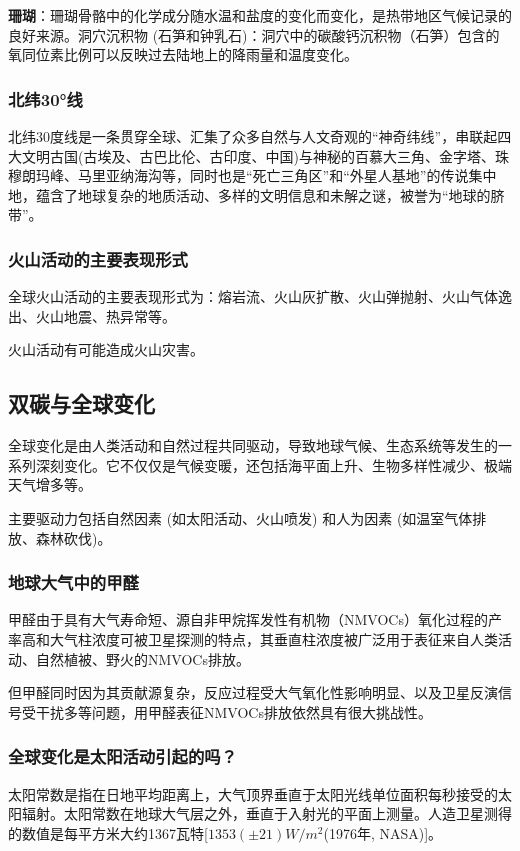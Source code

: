 \documentclass[12pt,a4paper]{article}
\begin{document}
	\textbf{珊瑚}：珊瑚骨骼中的化学成分随水温和盐度的变化而变化，是热带地区气候记录的良好来源。洞穴沉积物 (石笋和钟乳石)：洞穴中的碳酸钙沉积物（石笋）包含的氧同位素比例可以反映过去陆地上的降雨量和温度变化。
	
	\subsubsection{北纬30°线}
	北纬30度线是一条贯穿全球、汇集了众多自然与人文奇观的“神奇纬线”，串联起四大文明古国(古埃及、古巴比伦、古印度、中国)与神秘的百慕大三角、金字塔、珠穆朗玛峰、马里亚纳海沟等，同时也是“死亡三角区”和“外星人基地”的传说集中地，蕴含了地球复杂的地质活动、多样的文明信息和未解之谜，被誉为“地球的脐带”。
	\subsubsection{火山活动的主要表现形式}
	全球火山活动的主要表现形式为：熔岩流、火山灰扩散、火山弹抛射、火山气体逸出、火山地震、热异常等。
	
	火山活动有可能造成火山灾害。
	
	\subsection{双碳与全球变化}
	全球变化是由人类活动和自然过程共同驱动，导致地球气候、生态系统等发生的一系列深刻变化。它不仅仅是气候变暖，还包括海平面上升、生物多样性减少、极端天气增多等。
	
	主要驱动力包括自然因素 (如太阳活动、火山喷发) 和人为因素 (如温室气体排放、森林砍伐)。
	
	\subsubsection{地球大气中的甲醛}
	甲醛由于具有大气寿命短、源自非甲烷挥发性有机物（NMVOCs）氧化过程的产率高和大气柱浓度可被卫星探测的特点，其垂直柱浓度被广泛用于表征来自人类活动、自然植被、野火的NMVOCs排放。
	
	但甲醛同时因为其贡献源复杂，反应过程受大气氧化性影响明显、以及卫星反演信号受干扰多等问题，用甲醛表征NMVOCs排放依然具有很大挑战性。
	
	\subsubsection{全球变化是太阳活动引起的吗？}
	太阳常数是指在日地平均距离上，大气顶界垂直于太阳光线单位面积每秒接受的太阳辐射。太阳常数在地球大气层之外，垂直于入射光的平面上测量。人造卫星测得的数值是每平方米大约1367瓦特[$1353(\pm 21) W/m^2$(1976年, NASA)]。
	
\end{document}
